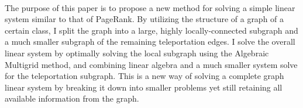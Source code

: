 \documentclass{article}
\begin{document}
\\
The purpose of this paper is to propose a new method for solving a simple linear system similar to that of PageRank. By utilizing the structure of a graph of a certain class, I split the graph into a large, highly locally-connected subgraph and a much smaller subgraph of the remaining teleportation edges. I solve the overall linear system by optimally solving the local subgraph using the Algebraic Multigrid method, and combining linear algebra and a much smaller system solve for the teleportation subgraph. This is a new way of solving a complete graph linear system by breaking it down into smaller problems yet still retaining all available information from the graph.

%
%
\end{document}
